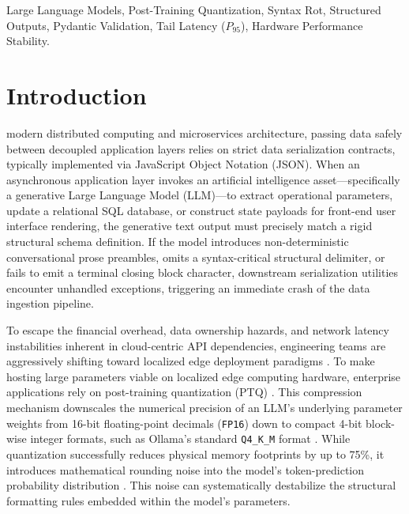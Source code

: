 \documentclass[11pt,journal,compsoc,onecolumn]{IEEEtran}
\begin{document}
{\begin{IEEEkeywords}
Large Language Models, Post-Training Quantization, Syntax Rot, Structured Outputs, Pydantic Validation, Tail Latency ($P_{95}$), Hardware Performance Stability.
\end{IEEEkeywords}}

\maketitle
\IEEEdisplaynontitleabstractindextext
\IEEEpeerreviewmaketitle

\section{Introduction}
\label{sec:intro}
 modern distributed computing and microservices architecture, passing data safely between decoupled application layers relies on strict data serialization contracts, typically implemented via JavaScript Object Notation (JSON). When an asynchronous application layer invokes an artificial intelligence asset—specifically a generative Large Language Model (LLM)—to extract operational parameters, update a relational SQL database, or construct state payloads for front-end user interface rendering, the generative text output must precisely match a rigid structural schema definition. If the model introduces non-deterministic conversational prose preambles, omits a syntax-critical structural delimiter, or fails to emit a terminal closing block character, downstream serialization utilities encounter unhandled exceptions, triggering an immediate crash of the data ingestion pipeline.

To escape the financial overhead, data ownership hazards, and network latency instabilities inherent in cloud-centric API dependencies, engineering teams are aggressively shifting toward localized edge deployment paradigms \cite{renney2026}. To make hosting large parameters viable on localized edge computing hardware, enterprise applications rely on post-training quantization (PTQ) \cite{frantar2024}. This compression mechanism downscales the numerical precision of an LLM's underlying parameter weights from 16-bit floating-point decimals (\texttt{FP16}) down to compact 4-bit block-wise integer formats, such as Ollama's standard \texttt{Q4\_K\_M} format \cite{ollama2024}. While quantization successfully reduces physical memory footprints by up to 75\%, it introduces mathematical rounding noise into the model's token-prediction probability distribution \cite{lee2025}. This noise can systematically destabilize the structural formatting rules embedded within the model's parameters.
\end{document}
